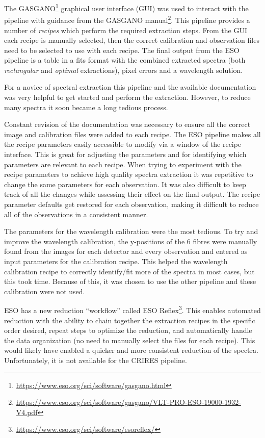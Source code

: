 The GASGANO\footnote{\href{https://www.eso.org/sci/software/gasgano.html}{https://www.eso.org/sci/software/gasgano.html}} graphical user interface (GUI) was used to interact with the pipeline with guidance from the GASGANO manual\footnote{\href{https://www.eso.org/sci/software/gasgano/VLT-PRO-{ESO}-19000-1932-V4.pdf}{https://www.eso.org/sci/software/gasgano/VLT-PRO-{ESO}-19000-1932-V4.pdf}}. This pipeline provides a number of \emph{recipes} which perform the required extraction steps. From the GUI each recipe is manually selected, then the correct calibration and observation files need to be selected to use with each recipe. The final output from the {ESO} pipeline is a table in a fits format with the combined extracted spectra (both \emph{rectangular} and \emph{optimal} extractions), pixel errors and a wavelength solution.

For a novice of spectral extraction this pipeline and the available documentation was very helpful to get started and perform the extraction. However, to reduce many spectra it soon became a long tedious process.

Constant revision of the documentation was necessary to ensure all the correct image and calibration files were added to each recipe. The {ESO} pipeline makes all the recipe parameters easily accessible to modify via a window of the recipe interface. This is great for adjusting the parameters and for identifying which parameters are relevant to each recipe. When trying to experiment with the recipe parameters to achieve high quality spectra extraction it was repetitive to change the same parameters for each observation. It was also difficult to keep track of all the changes while assessing their effect on the final output. The recipe parameter defaults get restored for each observation, making it difficult to reduce all of the observations in a consistent manner.

The parameters for the wavelength calibration were the most tedious. To try and improve the wavelength calibration, the {y-positions} of the 6 \thar{} fibres were manually found from the images for each detector and every observation and entered as input parameters for the calibration recipe. This helped the wavelength calibration recipe to correctly identify/fit more of the \thar{} spectra in most cases, but this took time. Because of this, it was chosen to use the other pipeline and these calibration were not used.

{ESO} has a new reduction ``workflow'' called {ESO} Reflex\citep{freudling_automated_2013}\footnote{\href{https://www.eso.org/sci/software/esoreflex/}{https://www.eso.org/sci/software/esoreflex/}}. This enables automated reduction with the ability to chain together the extraction recipes in the specific order desired, repeat steps to optimize the reduction, and automatically handle the data organization (no need to manually select the files for each recipe). This would likely have enabled a quicker and more consistent reduction of the spectra. Unfortunately, it is not available for the {CRIRES} pipeline.

